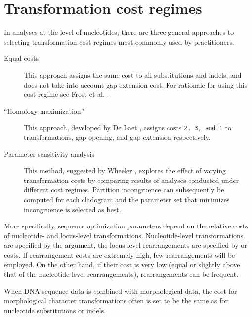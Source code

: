 \section{Transformation cost regimes}
In analyses at the level of nucleotides, there are three general approaches to selecting transformation cost regimes 
most commonly used by \poy practitioners.
\begin{description}
\item[Equal costs] This approach assigns the same cost to all substitutions and indels, and does not take into 
account gap extension cost. For rationale for using this cost regime see Frost et al. \cite{frost2001}.
\item[``Homology maximization''] This approach, developed by De Laet \cite{delaet2005}, assigns costs 
\texttt{2, 3, and 1} to transformations, gap opening, and gap extension respectively. 
\item[Parameter sensitivity analysis] This method, suggested by Wheeler \cite{wheeler1995}, explores the 
effect of varying transformation costs by comparing results of analyses conducted under different cost regimes. 
Partition incongruence can subsequently be computed  for each cladogram and the parameter set that minimizes 
incongruence is selected as best. 
\end{description}
More specifically, sequence optimization parameters depend on the relative costs of nucleotide- and locus-level transformations. 
Nucleotide-level transformations are specified by the  argument, the locus-level rearrangements are specified by 
 or  costs. If  rearrangement costs are extremely high, few 
rearrangements will be employed. On the other hand, if their cost is very low (equal or slightly above that of the nucleotide-level 
rearrangements), rearrangements can be frequent.

When DNA sequence data is combined with morphological data, the cost for morphological character transformations 
often is  set to be the same as for nucleotide substitutions or indels.

